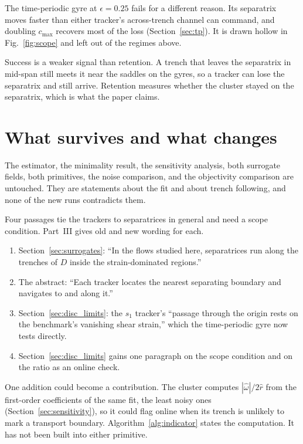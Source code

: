 \documentclass[11pt]{article}
\begin{document}
The time-periodic gyre at $\epsilon = 0.25$ fails for a different reason.
Its separatrix moves faster than either tracker's across-trench channel
can command, and doubling $c_{\max}$ recovers most of the loss
(Section~\ref{sec:tp}). It is drawn hollow in Fig.~\ref{fig:scope} and
left out of the regimes above.

Success is a weaker signal than retention. A trench that leaves the
separatrix in mid-span still meets it near the saddles on the gyres, so a
tracker can lose the separatrix and still arrive. Retention measures
whether the cluster stayed on the separatrix, which is what the paper
claims.

\section{What survives and what changes}

The estimator, the minimality result, the sensitivity analysis, both
surrogate fields, both primitives, the noise comparison, and the
objectivity comparison are untouched. They are statements about the fit
and about trench following, and none of the new runs contradicts them.

Four passages tie the trackers to separatrices in general and need a scope
condition. Part~III gives old and new wording for each.
\begin{enumerate}
\item Section~\ref{sec:surrogates}: ``In the flows studied here,
separatrices run along the trenches of $D$ inside the strain-dominated
regions.''
\item The abstract: ``Each tracker locates the nearest separating
boundary and navigates to and along it.''
\item Section~\ref{sec:disc_limits}: the $s_1$ tracker's ``passage through
the origin rests on the benchmark's vanishing shear strain,'' which the
time-periodic gyre now tests directly.
\item Section~\ref{sec:disc_limits} gains one paragraph on the scope
condition and on the ratio as an online check.
\end{enumerate}

One addition could become a contribution. The cluster computes
$|\hat\omega|/2\hat r$ from the first-order coefficients of the same fit,
the least noisy ones (Section~\ref{sec:sensitivity}), so it could flag
online when its trench is unlikely to mark a transport boundary.
Algorithm~\ref{alg:indicator} states the computation. It has not been
built into either primitive.
\end{document}
